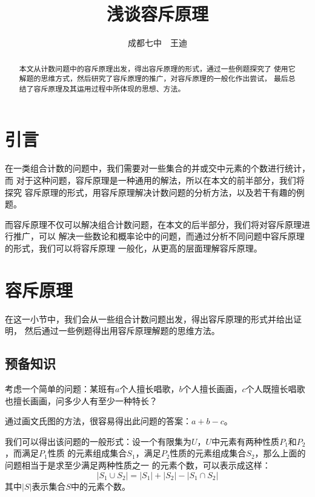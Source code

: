 \documentclass{noithesis}
\theoremstyle{plain}      \newtheorem{theorem}{定理}[subsection]
\theoremstyle{definition} \newtheorem{problem}{问题}[subsection]
\begin{document}

\title{浅谈容斥原理}
\author{成都七中~~王迪}

\maketitle

\begin{abstract}
本文从计数问题中的容斥原理出发，得出容斥原理的形式，通过一些例题探究了
使用它解题的思维方式，然后研究了容斥原理的推广，对容斥原理的一般化作出尝试，
最后总结了容斥原理及其运用过程中所体现的思想、方法。
\end{abstract}

\section{引言}

在一类组合计数的问题中，我们需要对一些集合的并或交中元素的个数进行统计，而
对于这种问题，容斥原理是一种通用的解法，所以在本文的前半部分，我们将探究
容斥原理的形式，用容斥原理解决计数问题的分析方法，以及若干有趣的例题。\par

而容斥原理不仅可以解决组合计数问题，在本文的后半部分，我们将对容斥原理进行推广，可以
解决一些数论和概率论中的问题，而通过分析不同问题中容斥原理的形式，我们可以将容斥原理
一般化，从更高的层面理解容斥原理。 \par

\section{容斥原理}

在这一小节中，我们会从一些组合计数问题出发，得出容斥原理的形式并给出证明，
然后通过一些例题得出用容斥原理解题的思维方法。

\subsection{预备知识}

考虑一个简单的问题：某班有$a$个人擅长唱歌，$b$个人擅长画画，$c$个人既擅长唱歌
也擅长画画，问多少人有至少一种特长？ \par

通过画文氏图的方法，很容易得出此问题的答案：$a+b-c$。 \par

我们可以得出该问题的一般形式：设一个有限集为$U$，$U$中元素有两种性质$P_1$和$P_2$，而满足$P_1$性质
的元素组成集合$S_1$，满足$P_2$性质的元素组成集合$S_2$，那么上面的问题相当于是求至少满足两种性质之一
的元素个数，可以表示成这样：
\[
|S_1 \cup S_2| = |S_1| + |S_2| - |S_1 \cap S_2|
\]
其中$|S|$表示集合$S$中的元素个数。 \par
\end{document}
